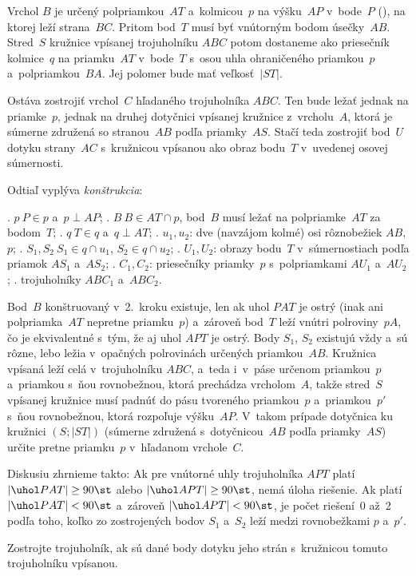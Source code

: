 {%
Vrchol $B$ je určený polpriamkou~$AT$ a~kolmicou~$p$
na výšku~$AP$ v~bode~$P$ (\obr), na ktorej leží strana~$BC$. Pritom bod~$T$
musí byť vnútorným bodom úsečky~$AB$. Stred~$S$ kružnice
%
vpísanej trojuholníku $ABC$ potom dostaneme ako priesečník kolmice~$q$
na priamku~$AT$ v~bode~$T$ s~osou uhla ohraničeného
priamkou~$p$ a~polpriamkou~$BA$. Jej polomer bude mať veľkosť~$|ST|$.

Ostáva zostrojiť vrchol~$C$ hľadaného trojuholníka $ABC$. Ten bude ležať jednak na priamke~$p$,
jednak na druhej dotyčnici vpísanej kružnice z~vrcholu~$A$, ktorá je súmerne združená
so stranou~$AB$ podľa priamky~$AS$.
Stačí teda zostrojiť
bod~$U$ dotyku strany~$AC$ s~kružnicou vpísanou ako obraz bodu~$T$
v~uvedenej osovej súmernosti.

Odtiaľ vyplýva {\it konštrukcia\/}:

. $p\: P \in p$ a~$p\perp AP$;
. $B\: B \in AT \cap p$, bod~$B$ musí ležať na polpriamke~$AT$ za bodom~$T$;
. $q\: T \in q$ a~$ q\perp AT$;
. $u_1, u_2$: dve (navzájom kolmé) osi rôznobežiek $AB$, $p$;
. $S_1, S_2\: S_1 \in  q\cap u_1$, $S_2\in q\cap  u_2$;
. $U_1, U_2$: obrazy bodu~$T$ v~súmernostiach podľa priamok $AS_1$ a~$AS_2$;
. $C_1, C_2$: priesečníky priamky~$p$ s~polpriamkami $AU_1$ a~$AU_2$;
. trojuholníky $ABC_1$ a~$ABC_2$.

\diskusia
Bod~$B$ konštruovaný
v~2.~kroku existuje, len ak uhol $PAT$ je ostrý (inak ani polpriamka~$AT$
nepretne priamku~$p$) a~zároveň bod~$T$ leží vnútri polroviny~$pA$, čo je
ekvivalentné s~tým, že aj uhol $APT$ je ostrý.
Body $S_1$, $S_2$ existujú vždy a~sú rôzne, lebo ležia v~opačných polrovinách
určených priamkou~$AB$.
Kružnica vpísaná leží celá v~trojuholníku $ABC$, a~teda i~v~páse určenom priamkou~$p$
a~priamkou s~ňou rovnobežnou, ktorá prechádza vrcholom~$A$,
takže
stred~$S$ vpísanej kružnice
musí padnúť do pásu tvoreného priamkou~$p$ a~priamkou~$p'$ s~ňou rovnobežnou, ktorá rozpoľuje
výšku~$AP$. V~takom prípade
dotyčnica ku kružnici $(S;|ST|)$
(súmerne združená s~dotyčnicou~$AB$ podľa priamky~$AS$) určite pretne priamku~$p$
v~hľadanom vrchole~$C$.

Diskusiu zhrnieme takto:
Ak pre vnútorné uhly trojuholníka $APT$ platí $|\uhol PAT|\ge90\st$ alebo
$|\uhol APT|\ge90\st$, nemá úloha riešenie. Ak platí
$|\uhol PAT|<90\st$ a~zároveň $|\uhol APT|<90\st$, je počet riešení~0 až~2
podľa toho, koľko zo zostrojených bodov $S_1$ a~$S_2$ leží
medzi rovnobežkami $p$ a~$p'$.


Zostrojte trojuholník, ak sú dané body dotyku jeho strán s~kružnicou
tomuto trojuholníku vpísanou.

}
